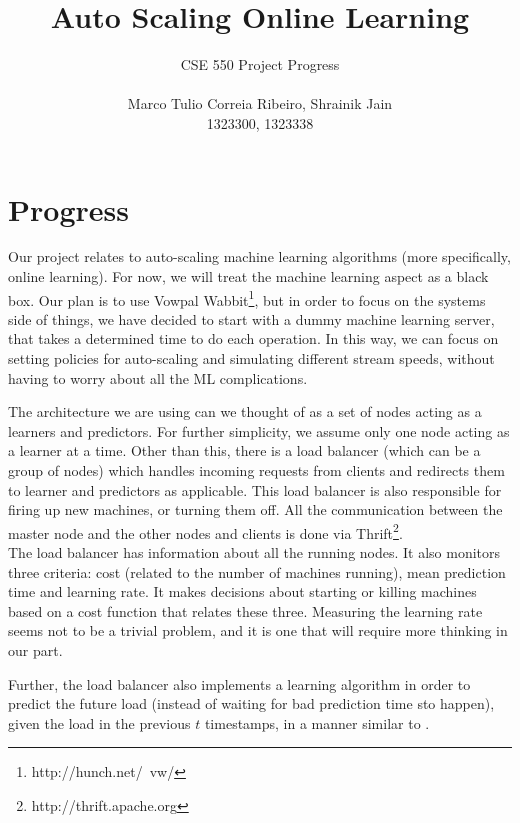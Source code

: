 \documentclass[letterpaper]{article}
\title{Auto Scaling Online Learning}
\date{}
\begin{document}
\author{CSE 550 Project Progress \\\\ Marco Tulio Correia Ribeiro, Shrainik Jain\\ 1323300, 1323338}
\maketitle

\section{Progress}
Our project relates to auto-scaling machine learning algorithms (more specifically, online
learning). For now, we will treat the machine learning aspect as a black box. Our plan is to
use Vowpal Wabbit\footnote{http://hunch.net/~vw/}, but in order to focus on the
systems side of things, we have decided to start with a dummy machine learning
server, that takes a determined time to do each operation. In this way, we can
focus on setting policies for auto-scaling and simulating different stream
speeds, without having to worry about all the ML complications.

The architecture we are using can we thought of as a
set of nodes acting as a learners and predictors. For further simplicity, we
assume only one node acting as a learner at a time. Other than this, there is a
load balancer (which can be a group of nodes) which handles incoming
requests from clients and
redirects them to learner and predictors as applicable. This load balancer is
also responsible for firing up new machines, or turning them off. All the
communication between the master node and the other nodes and clients is done
via Thrift\footnote{http://thrift.apache.org}. 
\\
The load balancer has information about all the running nodes. It also monitors
three criteria: cost (related to the number of machines running), mean
prediction time and learning rate. It makes decisions about starting or killing
machines based on a cost function that relates these three. Measuring the
learning rate seems not to be a trivial problem, and it is one that will require
more thinking in our part.

Further, the load balancer also implements a learning algorithm in order to
predict the future load (instead of waiting for bad prediction time sto happen),
given the load in the previous $t$ timestamps, in a manner similar to
\cite{jordan}. 
\end{document}
